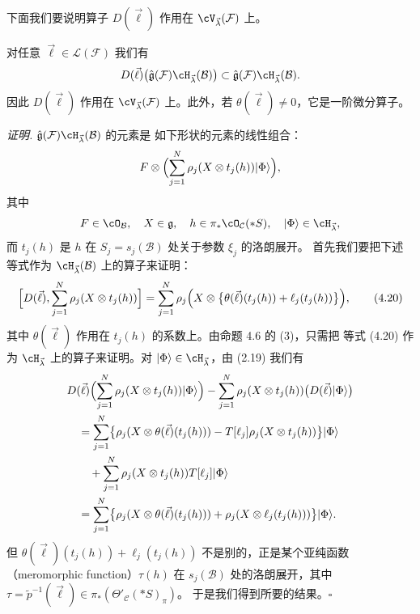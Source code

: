 下面我们要说明算子 $D(\vec{\ell})$ 作用在
$\cV_{\vec{\lambda}}(\mathcal{F})$ 上。

\begin{proposition}[4.7]
对任意 $\vec{\ell}\in\mathcal{L}(\mathcal{F})$ 我们有
\[
  D(\vec{\ell})\bigl(\hat{\mathfrak{g}}(\mathcal{F})
  \cH_{\vec{\lambda}}(\mathcal{B})\bigr)
  \subset\hat{\mathfrak{g}}(\mathcal{F})
  \cH_{\vec{\lambda}}(\mathcal{B}) .
\]
因此 $D(\vec{\ell})$ 作用在 $\cV_{\vec{\lambda}}(\mathcal{F})$ 上。此外，若
$\theta(\vec{\ell})\ne 0$，它是一阶微分算子。
\end{proposition}

\noindent\textit{证明.}\quad
$\hat{\mathfrak{g}}(\mathcal{F})\cH_{\vec{\lambda}}(\mathcal{B})$ 的元素是
如下形状的元素的线性组合：
\[
  F\otimes\Bigl(\sum_{j=1}^N\rho_j(X\otimes t_j(h))|\Phi\rangle\Bigr),
\]
其中
\[
  F\in\cO_\mathcal{B},\quad X\in\mathfrak{g},\quad
  h\in\pi_*\cO_\mathcal{C}(*S),\quad
  |\Phi\rangle\in\cH_{\vec{\lambda}},
\]
而 $t_j(h)$ 是 $h$ 在 $S_j=s_j(\mathcal{B})$ 处关于参数 $\xi_j$ 的洛朗展开。
首先我们要把下述等式作为 $\cH_{\vec{\lambda}}(\mathcal{B})$ 上的算子来证明：
\begin{equation}
  \Bigl[D(\vec{\ell}),\sum_{j=1}^N\rho_j(X\otimes t_j(h))\Bigr]
  = \sum_{j=1}^N\rho_j\Bigl(X\otimes
    \bigl\{\theta(\vec{\ell})(t_j(h))+\ell_j(t_j(h))\bigr\}\Bigr),
  \tag{4.20}
\end{equation}
其中 $\theta(\vec{\ell})$ 作用在 $t_j(h)$ 的系数上。由命题 4.6 的 (3)，只需把
等式 (4.20) 作为 $\cH_{\vec{\lambda}}$ 上的算子来证明。对
$|\Phi\rangle\in\cH_{\vec{\lambda}}$，由 (2.19) 我们有
\[
  \begin{aligned}
  &D(\vec{\ell})\Bigl(\sum_{j=1}^N\rho_j(X\otimes t_j(h))|\Phi\rangle\Bigr)
  -\sum_{j=1}^N\rho_j(X\otimes t_j(h))\bigl(D(\vec{\ell})|\Phi\rangle\bigr)\\
  &\quad = \sum_{j=1}^N\bigl\{\rho_j(X\otimes\theta(\vec{\ell})(t_j(h)))
    -T[\ell_j]\rho_j(X\otimes t_j(h))\bigr\}|\Phi\rangle\\
  &\qquad +\sum_{j=1}^N\rho_j(X\otimes t_j(h))T[\ell_j]|\Phi\rangle\\
  &\quad = \sum_{j=1}^N\bigl\{\rho_j(X\otimes\theta(\vec{\ell})(t_j(h)))
    +\rho_j(X\otimes\ell_j(t_j(h)))\bigr\}|\Phi\rangle .
  \end{aligned}
\]
但 $\theta(\vec{\ell})(t_j(h))+\ell_j(t_j(h))$ 不是别的，正是某个亚纯函数
（meromorphic function）$\tau(h)$ 在 $s_j(\mathcal{B})$ 处的洛朗展开，其中
$\tau=\tilde{p}^{-1}(\vec{\ell})\in\pi_*(\Theta'_\mathcal{C}(*S)_\pi)$。
于是我们得到所要的结果。\hfill$\square$

